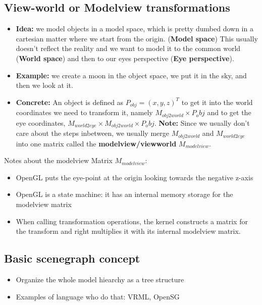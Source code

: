 \documentclass[11pt]{article}
\begin{document}
\subsection{View-world or Modelview transformations}
\begin{itemize}
    \item \textbf{Idea:}  we model objects in a model space, which is pretty dumbed down in a cartesian matter where we start from the origin. (\textbf{Model space}) This usually doesn't reflect the reality and we want to model it to the common world (\textbf{World space}) and then to our eyes perspective (\textbf{Eye perspective}). 
    \item \textbf{Example:}  we create a moon in the object space, we put it in the sky, and then we look at it. 
    \item \textbf{Concrete:} An object is defined as $P_{obj} = (x,y,z)^T$ to get it into the world coordinates we need to transform it, namely $M_{obj2world} \times P_obj$ and to get the eye coordinates, $M_{world2eye}\times M_{obj2world} \times P_obj$.
    \textbf{Note:} Since we usually don't care about the steps inbetween, we usually merge $M_{obj2world}$ and $M_{world2eye}$ into one matrix called the \textbf{modelview/viewworld} $M_{modelview}$.
\end{itemize}


Notes about the modelview Matrix $M_{modelview}$:
\begin{itemize}
    \item OpenGL puts the eye-point at the origin looking towards the negative z-axis
    \item OpenGL is a state machine: it has an internal memory storage for the modelview matrix
    \item When calling transformation operations, the kernel constructs a matrix for the transform and right multiplies it with its internal modelview matrix.
\end{itemize} %

 
\subsection{Basic scenegraph concept}
\begin{itemize}
    \item Organize the whole model hiearchy as a tree structure
    \item Examples of language who do that: VRML, OpenSG
\end{itemize}
\end{document}

